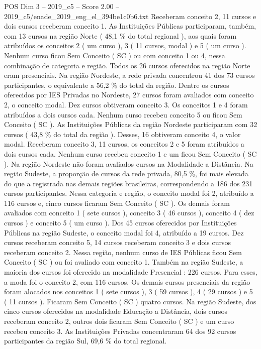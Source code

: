\begin{textsample}{POS Dim 3 – 2019\_c5 – Score 2.00 – 2019\_c5/enade\_2019\_eng\_el\_394be1c0b6.txt}
Receberam conceito 2, 11 cursos e dois cursos receberam conceito 1.
As Instituições Públicas participaram, também, com 13 cursos na região Norte ( 48,1 \% do total regional ), aos quais foram atribuídos os conceitos 2 ( um curso ), 3 ( 11 cursos, modal ) e 5 ( um curso ).
Nenhum curso ficou Sem Conceito ( SC ) ou com conceito 1 ou 4, nessa combinação de categoria e região.
Todos os 26 cursos oferecidos na região Norte eram presenciais.
Na região Nordeste, a rede privada concentrou 41 dos 73 cursos participantes, o equivalente a 56,2 \% do total da região.
Dentre os cursos oferecidos por IES Privadas no Nordeste, 27 cursos foram avaliados com conceito 2, o conceito modal.
Dez cursos obtiveram conceito 3.
Os conceitos 1 e 4 foram atribuídos a dois cursos cada.
Nenhum curso recebeu conceito 5 ou ficou Sem Conceito ( SC ).
As Instituições Públicas da região Nordeste participaram com 32 cursos ( 43,8 \% do total da região ).
Desses, 16 obtiveram conceito 4, o valor modal.
Receberam conceito 3, 11 cursos, os conceitos 2 e 5 foram atribuídos a dois cursos cada.
Nenhum curso recebeu conceito 1 e um ficou Sem Conceito ( SC ).
Na região Nordeste não foram avaliados cursos na Modalidade a Distância.
Na região Sudeste, a proporção de cursos da rede privada, 80,5 \%, foi mais elevada do que a registrada nas demais regiões brasileiras, correspondendo a 186 dos 231 cursos participantes.
Nessa categoria e região, o conceito modal foi 2, atribuído a 116 cursos e, cinco cursos ficaram Sem Conceito ( SC ).
Os demais foram avaliados com conceito 1 ( sete cursos ), conceito 3 ( 46 cursos ), conceito 4 ( dez cursos ) e conceito 5 ( um curso ).
Dos 45 cursos oferecidos por Instituições Públicas na região Sudeste, o conceito modal foi 4, atribuído a 19 cursos.
Dez cursos receberam conceito 5, 14 cursos receberam conceito 3 e dois cursos receberam conceito 2.
Nessa região, nenhum curso de IES Públicas ficou Sem Conceito ( SC ) ou foi avaliado com conceito 1.
Também na região Sudeste, a maioria dos cursos foi oferecido na modalidade Presencial : 226 cursos.
Para esses, a moda foi o conceito 2, com 116 cursos.
Os demais cursos presenciais da região foram alocados nos conceitos 1 ( sete cursos ), 3 ( 59 cursos ), 4 ( 29 cursos ) e 5 ( 11 cursos ).
Ficaram Sem Conceito ( SC ) quatro cursos.
Na região Sudeste, dos cinco cursos oferecidos na modalidade Educação a Distância, dois cursos receberam conceito 2, outros dois ficaram Sem Conceito ( SC ) e um curso recebeu conceito 3.
As Instituições Privadas concentraram 64 dos 92 cursos participantes da região Sul, 69,6 \% do total regional.

\end{textsample}
